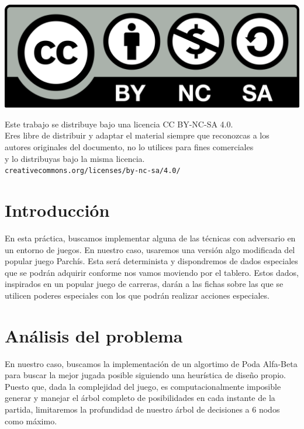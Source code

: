 \documentclass[10pt,a4paper]{article}
\begin{document}
\parbox[t]{\textwidth}{
  \includegraphics[scale=0.05]{by-nc-sa.png}\\[4pt]
  \raggedright %
  \sffamily\large
  {\Large Este trabajo se distribuye bajo una licencia CC BY-NC-SA 4.0.}\\[4pt]
  Eres libre de distribuir y adaptar el material siempre que reconozcas a los\\
  autores originales del documento, no lo utilices para fines comerciales\\
  y lo distribuyas bajo la misma licencia.\\[4pt]
  \texttt{creativecommons.org/licenses/by-nc-sa/4.0/}
}

\newpage

\tableofcontents

\newpage

\section{Introducción}

En esta práctica, buscamos implementar alguna de las técnicas con adversario en un entorno de juegos. En nuestro caso, usaremos una versión algo modificada del popular juego Parchís. Esta será determinista y dispondremos de dados especiales que se podrán adquirir conforme nos vamos moviendo por el tablero. Estos dados, inspirados en un popular juego de carreras, darán a las fichas sobre las que se utilicen poderes especiales con los que podrán realizar acciones especiales.

\section{Análisis del problema}
En nuestro caso, buscamos la implementación de un algortimo de Poda Alfa-Beta para buscar la mejor jugada posible siguiendo una heurística de diseño propio. Puesto que, dada la complejidad del juego, es computacionalmente imposible generar y manejar el árbol completo de posibilidades en cada instante de la partida, limitaremos la profundidad de nuestro árbol de decisiones a 6 nodos como máximo.
\end{document}
